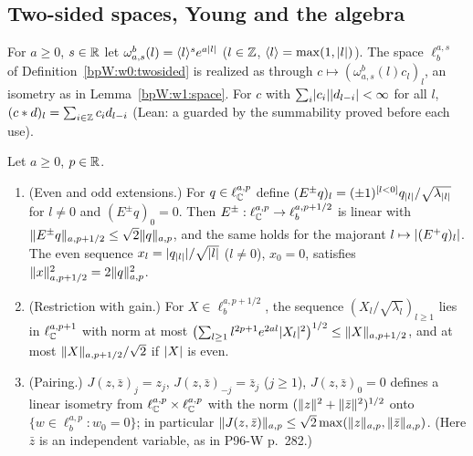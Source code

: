 \subsection{Two-sided spaces, Young and the algebra}\label{bpW:w1:twosided-sec}

\begin{definition}\label{bpW:w1:twosided-transport}
For $a\ge0$, $s\in\mathbb{R}$ let $\omega^b_{a,s}(l)=\langle l\rangle^se^{a\lvert l\rvert}$ ($l\in\mathbb{Z}$, $\langle l\rangle=\max(1,\lvert l\rvert)$). The space
$\ell^{a,s}_b$ of Definition~\ref{bpW:w0:twosided} is realized as  through
$c\mapsto(\omega^b_{a,s}(l)c_l)_l$, an isometry as in Lemma~\ref{bpW:w1:space}. For $c$ with
$\sum_i\lvert c_i\rvert\lvert d_{l-i}\rvert<\infty$ for all $l$, $(c*d)_l=\sum_{i\in\mathbb{Z}}c_id_{l-i}$ (Lean: a  guarded by the
summability proved before each use).
\end{definition}

\begin{lemma}\label{bpW:w1:twosided}
Let $a\ge0$, $p\in\mathbb{R}$.
\begin{enumerate}[label=(\roman*)]
\item (Even and odd extensions.) For $q\in\ell^{a,p}_{\mathbb{C}}$ define $(E^\pm q)_l=(\pm1)^{[l<0]}q_{\lvert l\rvert}/\sqrt{\lambda_{\lvert l\rvert}}$
  for $l\ne0$ and $(E^\pm q)_0=0$. Then $E^\pm:\ell^{a,p}_{\mathbb{C}}\to\ell^{a,p+1/2}_b$ is linear with
  $\lVert E^\pm q\rVert_{a,p+1/2}\le\sqrt2\lVert q\rVert_{a,p}$, and the same holds for the majorant
  $l\mapsto\lvert (E^+q)_l\rvert$. The even sequence $x_l=\lvert q_{\lvert l\rvert}\rvert/\sqrt{\lvert l\rvert}$ ($l\ne0$), $x_0=0$, satisfies
  $\lVert x\rVert_{a,p+1/2}^2=2\lVert q\rVert_{a,p}^2$.
\item (Restriction with gain.) For $X\in\ell^{a,p+1/2}_b$, the sequence $(X_l/\sqrt{\lambda_l})_{l\ge1}$ lies in
  $\ell^{a,p+1}_{\mathbb{C}}$ with norm at most $\bigl(\sum_{l\ge1}l^{2p+1}e^{2al}\lvert X_l\rvert^2\bigr)^{1/2}\le\lVert X\rVert_{a,p+1/2}$, and
  at most $\lVert X\rVert_{a,p+1/2}/\sqrt2$ if $\lvert X\rvert$ is even.
\item (Pairing.) $J(z,\bar z)_j=z_j$, $J(z,\bar z)_{-j}=\bar z_j$ ($j\ge1$), $J(z,\bar z)_0=0$ defines a linear isometry
  from $\ell^{a,p}_{\mathbb{C}}\times\ell^{a,p}_{\mathbb{C}}$ with the norm $(\lVert z\rVert^2+\lVert \bar z\rVert^2)^{1/2}$ onto
  $\{w\in\ell^{a,p}_b:w_0=0\}$; in particular $\lVert J(z,\bar z)\rVert_{a,p}\le\sqrt2\max(\lVert z\rVert_{a,p},\lVert \bar z\rVert_{a,p})$.
  (Here $\bar z$ is an independent variable, as in P96-W p.~282.)
\end{enumerate}
\end{lemma}

